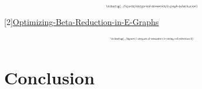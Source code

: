 \documentclass[aspectratio=169]{beamer}
\begin{document}
\begin{frame}
    \[
        \scalebox{0.4}{
        \tikzfig{../figures/categorical-semantics/e-graph-substitution}
        }
    \]
    \tiny{[2]\href{https://pldi23.sigplan.org/details/egraphs-2023-papers/12/Optimizing-Beta-Reduction-in-E-Graphs}{Optimizing-Beta-Reduction-in-E-Graphs}}
    \[
        \scalebox{0.35}{
        \tikzfig{../figures/categorical-semantics/e-string-substitution-2}
        }
    \]
\end{frame}

\section{Conclusion}
\end{document}
